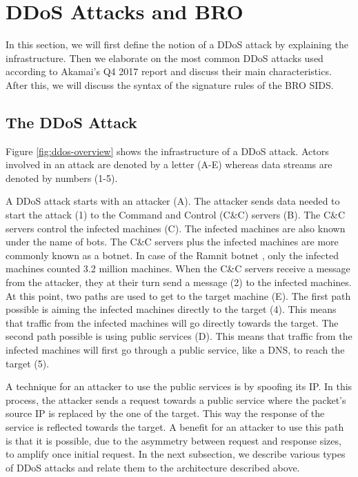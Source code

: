 
\section{DDoS Attacks and BRO}\label{subsec:ddos-and-bro}
In this section, we will first define the notion of a DDoS attack by explaining the infrastructure. Then we elaborate on the most common DDoS attacks used according to Akamai's Q4 2017 report \cite{Akamai2017-4} and discuss their main characteristics. After this, we will discuss the syntax of the signature rules of the BRO SIDS.

\subsection{The DDoS Attack}
Figure \ref{fig:ddos-overview} shows the infrastructure of a DDoS attack. Actors involved in an attack are denoted by a letter (A-E) whereas data streams are denoted by numbers (1-5). 

A DDoS attack starts with an attacker (A). The attacker sends data needed to start the attack (1) to the Command and Control (C\&C) servers (B). The C\&C servers control the infected machines (C). The infected machines are also known under the name of bots. The C\&C servers plus the infected machines are more commonly known as a botnet. In case of the Ramnit botnet \cite{europol2015}, only the infected machines counted 3.2 million machines. When the C\&C servers receive a message from the attacker, they at their turn send a message (2) to the infected machines. At this point, two paths are used to get to the target machine (E). The first path possible is aiming the infected machines directly to the target (4). This means that traffic from the infected machines will go directly towards the target. The second path possible is using public services (D). This means that traffic from the infected machines will first go through a public service, like a DNS, to reach the target (5). 

A technique for an attacker to use the public services is by spoofing its IP. In this process, the attacker sends a request towards a public service where the packet's source IP is replaced by the one of the target.  This way the response of the service is reflected towards the target. A benefit for an attacker to use this path is that it is possible, due to the asymmetry between request and response sizes, to amplify once initial request.  In the next subsection, we describe various types of DDoS attacks and relate them to the architecture described above. 

